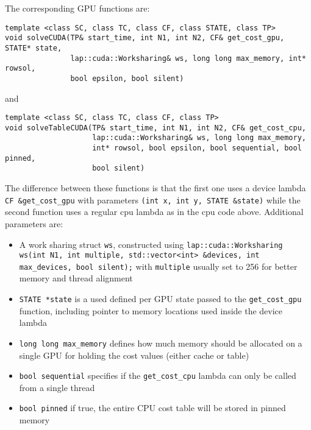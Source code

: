 \documentclass[format=acmsmall,review=false, screen=true]{acmart}
\begin{document}
The corresponding GPU functions are:
\begin{verbatim}
template <class SC, class TC, class CF, class STATE, class TP>
void solveCUDA(TP& start_time, int N1, int N2, CF& get_cost_gpu, STATE* state,
               lap::cuda::Worksharing& ws, long long max_memory, int* rowsol,
               bool epsilon, bool silent)
\end{verbatim}
and
\begin{verbatim}
template <class SC, class TC, class CF, class TP>
void solveTableCUDA(TP& start_time, int N1, int N2, CF& get_cost_cpu,
                    lap::cuda::Worksharing& ws, long long max_memory,
                    int* rowsol, bool epsilon, bool sequential, bool pinned,
                    bool silent)
\end{verbatim}
The difference between these functions is that the first one uses a device lambda \texttt{CF \&get\_cost\_gpu} with parameters \texttt{(int x, int y, STATE \&state)} while the second function uses a regular cpu lambda as in the cpu code above.
Additional parameters are:
\begin{itemize}
\item A work sharing struct \texttt{ws}, constructed using \texttt{lap::cuda::Worksharing ws(int N1, int multiple, std::vector<int> \&devices, int max\_devices, bool silent);} with \texttt{multiple} usually set to 256 for better memory and thread alignment
\item \texttt{STATE *state} is a used defined per GPU state passed to the \texttt{get\_cost\_gpu} function, including pointer to memory locations used inside the device lambda
\item \texttt{long long max\_memory} defines how much memory should be allocated on a single GPU for holding the cost values (either cache or table)
\item \texttt{bool sequential} specifies if the \texttt{get\_cost\_cpu} lambda can only be called from a single thread
\item \texttt{bool pinned} if true, the entire CPU cost table will be stored in pinned memory
\end{itemize}
\end{document}
